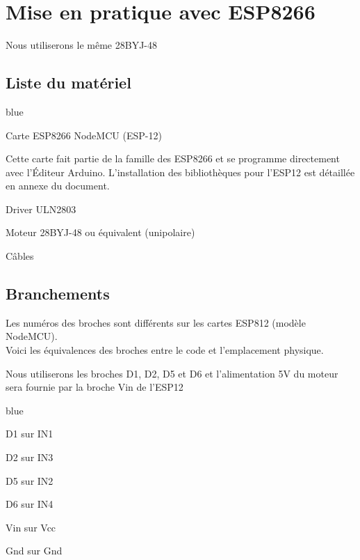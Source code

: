 \section{Mise en pratique avec ESP8266} 

Nous utiliserons le même \pap 28BYJ-48

\subsection{Liste du matériel}

\begin{items}{blue}{\Bullet}
  \item Carte ESP8266 NodeMCU (ESP-12)


  Cette carte fait partie de la famille des ESP8266 et se programme directement avec l’Éditeur Arduino. 
  L'installation des bibliothèques pour l'ESP12 est détaillée en annexe du document.
  \item Driver ULN2803
  \item Moteur \pap 28BYJ-48 ou équivalent (\pap unipolaire)
  \item Câbles
\end{items}


\subsection{Branchements}

Les numéros des broches sont différents sur les cartes ESP812 (modèle NodeMCU).\\
Voici les équivalences des broches entre le code et l'emplacement physique.


Nous utiliserons les broches D1, D2, D5 et D6 et  l'alimentation 5V du moteur sera fournie par la broche Vin de l'ESP12

\begin{items}{blue}{\Bullet}
  \item D1 sur IN1
  \item D2 sur IN3
  \item D5 sur IN2
  \item D6 sur IN4
  \item Vin sur Vcc
  \item Gnd sur Gnd
\end{items}


